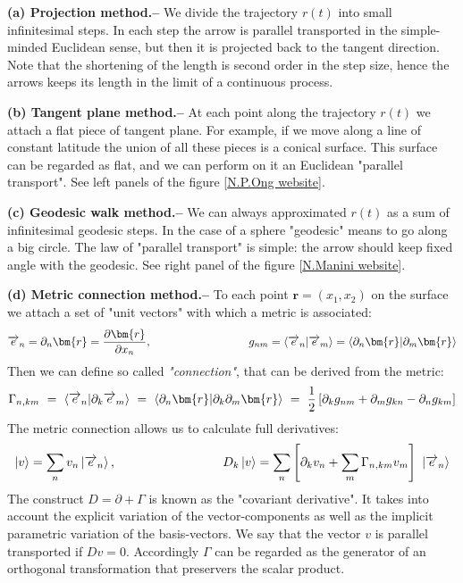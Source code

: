 \documentclass[onecolumn,fleqn, 11pt]{revtex4}
\newcommand{\fracd}[2]{\frac{\partial #1}{\partial #2}}
\newcommand{\ket}[1]{\left| #1 \right\rangle}
\newcommand{\Braket}[2]{\left\langle #1 \middle| #2 \right\rangle}
\newcommand{\ora}{\protect\overrightarrow}
\newcommand{\beq}{\begin{eqnarray}}
\newcommand{\eeq}{\end{eqnarray}}
\begin{document}
{\bf (a) Projection method.-- } 
We divide the trajectory $r(t)$ into small infinitesimal steps. In each step the arrow is parallel transported in the simple-minded Euclidean sense, but then it is projected back to the tangent direction. Note that the shortening of the length is second order in the step size, hence the arrows keeps its length in the limit of a continuous process. 

{\bf (b) Tangent plane method.-- }  At each point along the trajectory ${r(t)}$ we attach a flat piece of tangent plane. For example, if we move along a line of constant latitude the union of all these pieces is a conical surface. This surface can be regarded as flat, and we can perform on it an Euclidean "parallel transport". See left panels of the figure [\href{http://www.princeton.edu/~npo/SurveyTopics/Berry_examples_files/Berryphase.html}{N.P.Ong website}].

{\bf (c) Geodesic walk method.-- } 
We can always approximated $r(t)$ as a sum of infinitesimal geodesic steps. In the case of a sphere "geodesic" means to go along a big circle. The law of "parallel transport" is simple: the arrow should keep fixed angle with the geodesic. See right panel of the figure [\href{http://www.mi.infm.it/manini/berryphase.html}{N.Manini website}].

{\bf (d) Metric connection method.-- }  
To each point ${\bm{r}=(x_1,x_2)}$ on the surface we attach a set of "unit vectors" with which a metric is associated:
\beq
\ora{e}_n = \partial_n \bm{r} = \fracd{\bm{r}}{x_n}, 
\hspace*{3cm}
g_{nm} = \Braket{\ora{e}_n}{\ora{e}_m} =  \Braket{\partial_n \bm{r}}{\partial_m \bm{r}}  
\eeq 
Then we can define so called {\em "connection"}, that can be derived from the metric:  
\beq
\Gamma_{n,km} \ = \  \Braket{\ora{e}_n}{\partial_k \ora{e}_m} 
\ = \ \Braket{\partial_n \bm{r}}{ \partial_k \partial_m\bm{r}}
\ = \ \frac{1}{2}\left[\partial_k g_{nm} + \partial_m g_{kn} - \partial_n g_{km} \right]
\eeq
The metric connection allows us to calculate full derivatives: 
\beq
\ket{v} = \sum_n v_n \ket{\ora{e}_n}, 
\hspace*{3cm}
D_k\ket{v} = \sum_n  \left[ \partial_k v_n + \sum_{m} \Gamma_{n,km}v_m \right] \ \ket{\ora{e}_n} 
\eeq   
The construct ${D=\partial + \Gamma}$ is known as the "covariant derivative". 
It takes into account the explicit variation of the vector-components 
as well as the implicit parametric variation of the basis-vectors. 
We say that the vector $v$ is parallel transported if ${Dv=0}$.  
Accordingly $\Gamma$ can be regarded as the generator of an orthogonal transformation
that preservers the scalar product. 
\end{document}
